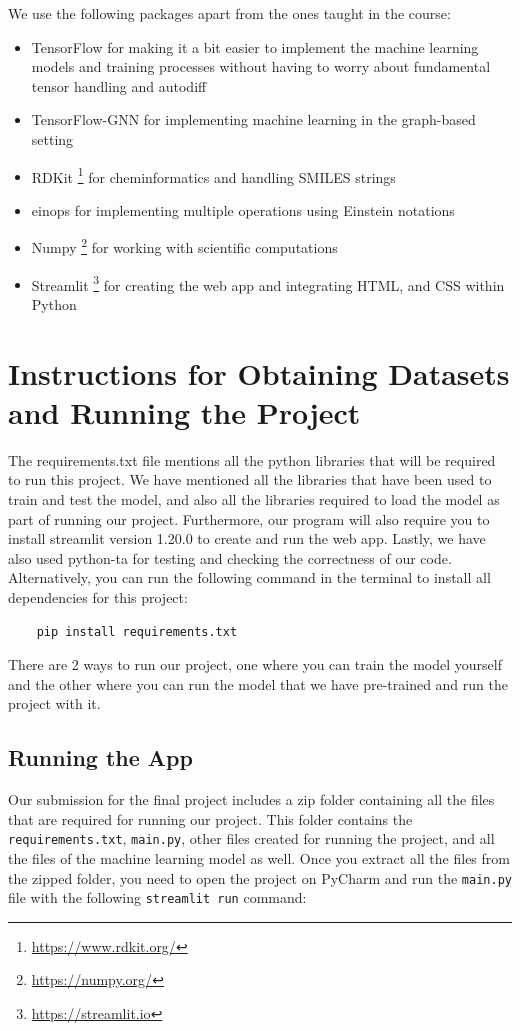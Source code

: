 \documentclass[fontsize=11pt]{article}
\begin{document}
We use the following packages apart from the ones taught in the course:
\begin{itemize}
    \item TensorFlow \citep{abadi2016tensorflow} for making it a bit easier to implement the machine learning models and training processes without having to worry about fundamental tensor handling and autodiff
    \item TensorFlow-GNN \citep{ferludin2022tf} for implementing machine learning in the graph-based setting
    \item RDKit \footnote{\url{https://www.rdkit.org/}} for cheminformatics and handling SMILES strings
    \item einops \citep{rogozhnikov2022einops} for implementing multiple operations using Einstein notations
    \item Numpy \footnote{\url{https://numpy.org/}} for working with scientific computations
    \item Streamlit \footnote{\url{https://streamlit.io}} for creating the web app and integrating HTML, and CSS within Python
\end{itemize}

\section*{Instructions for Obtaining Datasets and Running the Project}

The requirements.txt file mentions all the python libraries that will be required to run this project. We have mentioned all the libraries that have been used to train and test the model, and also all the libraries required to load the model as part of running our project. Furthermore, our program will also require you to install streamlit version 1.20.0 to create and run the web app. Lastly, we have also used python-ta for testing and checking the correctness of our code. Alternatively, you can run the following command in the terminal to install all dependencies for this project:

\begin{verbatim}
    pip install requirements.txt
\end{verbatim}

There are 2 ways to run our project, one where you can train the model yourself and the other where you can run the model that we have pre-trained and run the project with it.

\subsection*{Running the App}
Our submission for the final project includes a zip folder containing all the files that are required for running our project. This folder contains the \texttt{requirements.txt}, \texttt{main.py}, other files created for running the project, and all the files of the machine learning model as well. Once you extract all the files from the zipped folder, you need to open the project on PyCharm and run the \texttt{main.py} file with the following \texttt{streamlit run} command:
\end{document}
